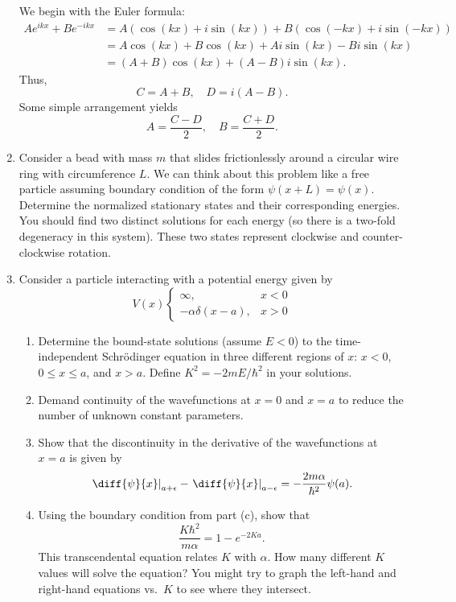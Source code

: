 \documentclass[a4paper, 12pt]{config/homework}
\begin{document}
\begin{enumerate}
We begin with the Euler formula:
\begin{align*}
Ae^{ikx} + Be^{-ikx} &= A\left(\cos(kx) + i \sin(kx)\right) + B\left(\cos(-kx) + i\sin(-kx)\right)
\\&= A\cos(kx) + B\cos(kx) + Ai\sin(kx) - Bi\sin(kx)
\\&= (A+B)\cos(kx) + (A-B)i\sin(kx).
\end{align*}
Thus,
\[C = A+B,\quad D=i(A-B).\]
Some simple arrangement yields
\[A = \frac{C-D}{2}, \quad B = \frac{C+D}{2}.\]

\pagebreak
\item Consider a bead with mass \(m\) that slides frictionlessly around a circular wire ring with circumference \(L\). We can think about this problem like a free particle assuming boundary condition of the form \(\psi(x+L) = \psi(x)\). Determine the normalized stationary states and their corresponding energies. You should find two distinct solutions for each energy (so there is a two-fold degeneracy in this system). These two states represent clockwise and counter-clockwise rotation.



\pagebreak
\item Consider a particle interacting with a potential energy given by
\[V(x)\begin{cases}
\infty, & x < 0 \\ -\alpha\delta(x-a), & x>0
\end{cases}\]
\begin{enumerate}
\item Determine the bound-state solutions (assume \(E<0\)) to the time-independent Schr{\"o}dinger equation in three different regions of \(x\): \(x<0\), \(0 \le x \le a\), and \(x > a\). Define \(K^2=-2mE/\hbar^2\) in your solutions.



\item Demand continuity of the wavefunctions at \(x=0\) and \(x=a\) to reduce the number of unknown constant parameters.



\item Show that the discontinuity in the derivative of the wavefunctions at \(x=a\) is given by
\[\left.\diff{\psi}{x}\right|_{a+\epsilon} - \left.\diff{\psi}{x}\right|_{a-\epsilon} = - \frac{2m\alpha}{\hbar^2}\psi(a).\]


\item Using the boundary condition from part (c), show that
\[\frac{K\hbar^2}{m\alpha} = 1 - e^{-2Ka}.\]
This transcendental equation relates \(K\) with \(\alpha \). How many different \(K\) values will solve the equation? You might try to graph the left-hand and right-hand equations vs.\ \( K \) to see where they intersect.



\end{enumerate}
\end{enumerate}
\end{document}
